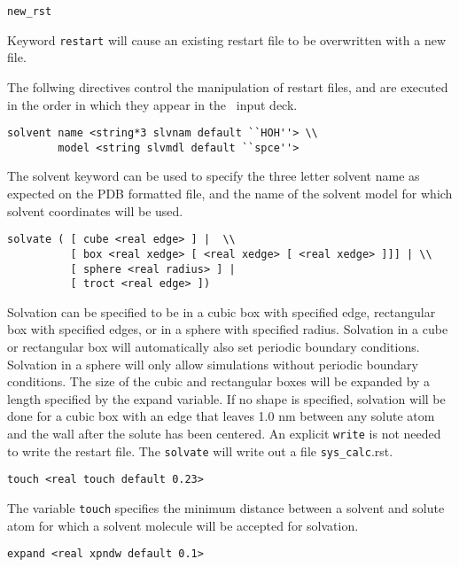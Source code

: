 \begin{verbatim}
new_rst
\end{verbatim}

Keyword \verb+restart+ will cause an existing restart file to be
overwritten with a new file.

The follwing directives control the manipulation of restart
files, and are executed in the order in which they
appear in the \prepare\ input deck.

\begin{verbatim}
solvent name <string*3 slvnam default ``HOH''> \\
        model <string slvmdl default ``spce''>
\end{verbatim}

The solvent keyword can be used to specify the three letter solvent name 
as expected on the PDB formatted file, and the name of the solvent model
for which solvent coordinates will be used.

\begin{verbatim}
solvate ( [ cube <real edge> ] |  \\
          [ box <real xedge> [ <real xedge> [ <real xedge> ]]] | \\
          [ sphere <real radius> ] |
          [ troct <real edge> ])
\end{verbatim}

Solvation can be specified to be in a cubic box with specified edge,
rectangular box with specified edges, or in a sphere with specified
radius. Solvation in a cube or rectangular box will automatically also
set periodic boundary conditions. Solvation in a sphere will only allow
simulations without periodic boundary conditions. The size of the cubic
and rectangular boxes will be expanded by a length specified by the
expand variable. If no shape is specified, solvation will be done for
a cubic box with an edge that leaves 1.0 nm between any solute atom and
the wall after the solute has been centered. An explicit \verb+write+
is not needed to write the restart file. The \verb+solvate+ will
write out a file \verb+sys_calc+.rst.

\begin{verbatim}
touch <real touch default 0.23>
\end{verbatim}

The variable \verb+touch+ specifies the minimum distance between a solvent 
and solute atom for which a solvent molecule will be accepted for solvation.

\begin{verbatim}
expand <real xpndw default 0.1>
\end{verbatim}

